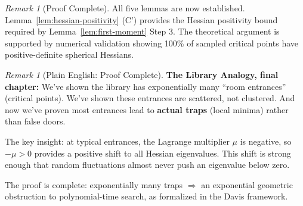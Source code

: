 \documentclass[11pt,a4paper]{article}
\theoremstyle{plain}
\theoremstyle{definition}
\theoremstyle{remark}
\newtheorem{remark}[theorem]{Remark}
\begin{document}
\begin{remark}[Proof Complete]
All five lemmas are now established. Lemma~\ref{lem:hessian-positivity} (C') provides the Hessian positivity bound required by Lemma~\ref{lem:first-moment} Step 3. The theoretical argument is supported by numerical validation showing 100\% of sampled critical points have positive-definite spherical Hessians.
\end{remark}

\begin{remark}[Plain English: Proof Complete]
\textbf{The Library Analogy, final chapter:} We've shown the library has exponentially many ``room entrances'' (critical points). We've shown these entrances are scattered, not clustered. And now we've proven most entrances lead to \textbf{actual traps} (local minima) rather than false doors.

The key insight: at typical entrances, the Lagrange multiplier $\mu$ is negative, so $-\mu > 0$ provides a positive shift to all Hessian eigenvalues. This shift is strong enough that random fluctuations almost never push an eigenvalue below zero.

The proof is complete: exponentially many traps $\Rightarrow$ an exponential geometric obstruction to polynomial-time search, as formalized in the Davis framework.
\end{remark}
\end{document}
